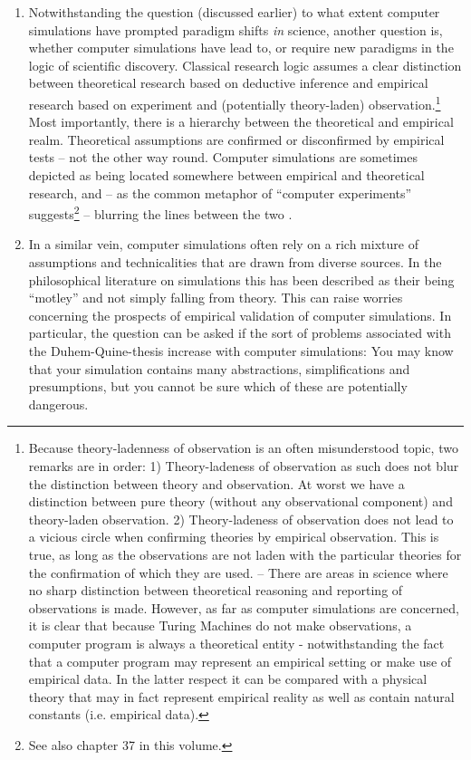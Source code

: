 \documentclass[12pt, a4paper]{article}
\begin{document}
\begin{enumerate}

  \item Notwithstanding the question (discussed earlier) to what
    extent computer simulations have prompted paradigm shifts {\em in}
    science, another question is, whether computer simulations have
    lead to, or require new paradigms in the logic of scientific
    discovery. Classical research logic assumes a clear distinction
    between theoretical research based on deductive inference and
    empirical research based on experiment and (potentially
    theory-laden) observation.\footnote{Because theory-ladenness of
    observation is an often misunderstood topic, two remarks are in
    order: 1) Theory-ladeness of observation as such does not blur the
    distinction between theory and observation. At worst we have a
    distinction between pure theory (without any observational
    component) and theory-laden observation. 2) Theory-ladeness of
    observation does not lead to a vicious circle when confirming
    theories by empirical observation. This is true, as long as the
    observations are not laden with the particular theories for the
    confirmation of which they are used. -- There are areas in science
    where no sharp distinction between theoretical reasoning and
    reporting of observations is made. However, as far as computer
    simulations are concerned, it is clear that because Turing
    Machines do not make observations, a computer program is always a
    theoretical entity - notwithstanding the fact that a computer
    program may represent an empirical setting or make use of
    empirical data. In the latter respect it can be compared with a
    physical theory that may in fact represent empirical reality as
    well as contain natural constants (i.e. empirical data).} Most
    importantly, there is a hierarchy between the theoretical and
    empirical realm. Theoretical assumptions are confirmed or
    disconfirmed by empirical tests -- not the other way round.
    Computer simulations are sometimes depicted as being located
    somewhere between empirical and theoretical research, and -- as
    the common metaphor of ``computer experiments''
    suggests\footnote{See also chapter 37 \citep{beisbart:2019} in
    this volume.} -- blurring the lines between the two
    \citep{morrison:2009}.

  \item In a similar vein, computer simulations often rely on a rich
    mixture of assumptions and technicalities that are drawn from
    diverse sources. In the philosophical literature on simulations
    this has been described as their being
    ``motley''\citep{winsberg:2015} and not simply falling from
    theory. This can raise worries concerning the prospects of
    empirical validation of computer simulations. In particular, the
    question can be asked if the sort of problems associated with the
    Duhem-Quine-thesis increase with computer simulations: You may
    know that your simulation contains many abstractions,
    simplifications and presumptions, but you cannot be sure which of
    these are potentially dangerous.


\end{enumerate}
\end{document}
